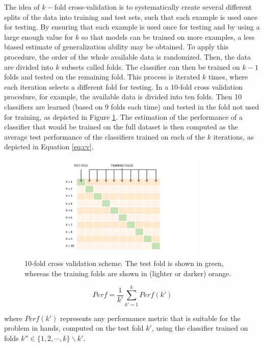 The idea of $k-$fold cross-validation is to systematically create several different splits of the data into training and test sets, such that each example is used once for testing. By ensuring that each example is used once for testing and by using a large enough value for $k$ so that models can be trained on more examples, a less biased estimate of generalization ability may be obtained. To apply this procedure, the order of the whole available data is randomized. Then, the data are divided into $k$ subsets called folds. The classifier can then be trained on $k-1$ folds and tested on the remaining fold. This process is iterated $k$ times, where each iteration selects a different fold for testing. In a 10-fold cross validation procedure, for example, the available data is divided into ten folds. Then 10 classifiers are learned (based on 9 folds each time) and tested in the fold not used for training, as depicted in Figure \ref{fig:10fold}. The estimation of the performance of a classifier that would be trained on the full dataset is then computed as the average test performance of the classifiers trained on each of the $k$ iterations, as depicted in Equation \ref{eq:cv}. 

\begin{figure}[h]
    \centering
    \includegraphics[width=0.8\textwidth]{"Part 3 - Learning Systems/Supervised Learning/Evaluation/figures/10fold-1-1.pdf"}
    \caption{10-fold cross validation scheme. The test fold is shown in green, whereas the training folds are shown in (lighter or darker) orange.}
    \label{fig:10fold}
\end{figure}

\begin{equation}
    Perf = \frac{1}{k'}\sum_{k' = 1}^{k} Perf(k')
    \label{eq:cv}
\end{equation}

\noindent where $Perf(k')$ represents any performance metric that is suitable for the problem in hands, computed on the test fold $k'$, using the classifier trained on folds $k'' \in \{1,2,\cdots,k\} \backslash k'$.




